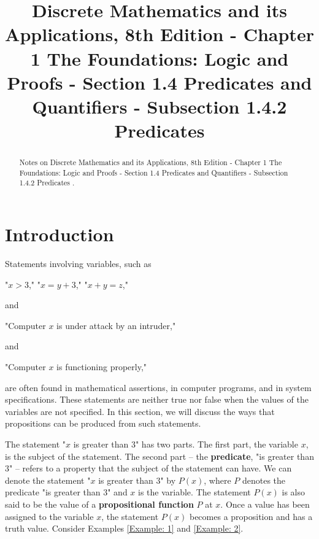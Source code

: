 \documentclass{Axon}
\title{Discrete Mathematics and its Applications, 8th Edition - Chapter 1 The Foundations: Logic and Proofs - Section 1.4 Predicates and Quantifiers - Subsection 1.4.2 Predicates}
\begin{document}
\maketitle
\makeauthor
\begin{abstract}
Notes on Discrete Mathematics and its Applications, 8th Edition - Chapter 1 The Foundations: Logic and Proofs - Section 1.4 Predicates and Quantifiers - Subsection 1.4.2 Predicates \cite{Rosen}.
\end{abstract}
\section{Introduction}
Statements involving variables, such as

\begin{center}
    "\(x > 3\)," "\(x = y + 3\)," "\(x + y = z\),"
\end{center}

and

\begin{center}
    "Computer \(x\) is under attack by an intruder,"
\end{center}

and

\begin{center}
    "Computer \(x\) is functioning properly,"
\end{center}

are often found in mathematical assertions, in computer programs, and in system specifications. These statements are neither true nor false when the values of the variables are not specified. In this section, we will discuss the ways that propositions can be produced from such statements.

The statement "\(x\) is greater than \(3\)" has two parts. The first part, the variable \(x\), is the subject of the statement. The second part – the \textbf{predicate}, "is greater than \(3\)" – refers to a property that the subject of the statement can have. We can denote the statement "\(x\) is greater than \(3\)" by \(P(x)\), where \(P\) denotes the predicate "is greater than \(3\)" and \(x\) is the variable. The statement \(P(x)\) is also said to be the value of a \textbf{propositional function} \(P\) at \(x\). Once a value has been assigned to the variable \(x\), the statement \(P(x)\) becomes a proposition and has a truth value. Consider Examples \ref{Example: 1} and \ref{Example: 2}.
\end{document}
